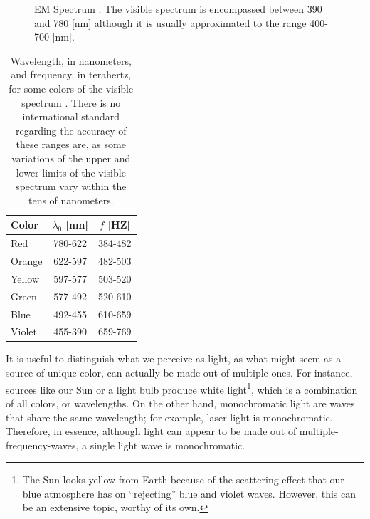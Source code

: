 \begin{figure}[htbp]
    \centering
    \caption{EM Spectrum \cite{EM_Spectrum-Figure}. The visible spectrum is encompassed between 390 and 780 [nm] although it is usually approximated to the range 400-700 [nm].}
    \label{fig:EM_Spectrum}
\end{figure}

\begin{table}[htbp]
    \centering
    \begin{tabular}{|l|c|c|}
    \hline
    \textbf{Color} & \textbf{$\lambda_0$ [nm]} & \textbf{$f$ [HZ]} \\ \hline
    Red           & 780-622                       & 384-482                  \\ \hline
    Orange        & 622-597                       & 482-503                  \\ \hline
    Yellow       & 597-577                       & 503-520                  \\ \hline
    Green          & 577-492                       & 520-610                  \\ \hline
    Blue           & 492-455                       & 610-659                  \\ \hline
    Violet        & 455-390                       & 659-769                  \\ \hline
    \end{tabular}
    \caption{Wavelength, in nanometers, and frequency, in terahertz, for some colors of the visible spectrum \cite{Hecht_Optics-Visible_Light}. There is no international standard regarding the accuracy of these ranges are, as some variations of the upper and lower limits of the visible spectrum vary within the tens of nanometers.}
    \label{tab:VisibleLight}
\end{table}

\newpage
It is useful to distinguish what we perceive as light, as what might seem as a source of unique color, can actually be made out of multiple ones. For instance, sources like our Sun or a light bulb produce white light\footnote{The Sun looks yellow from Earth because of the scattering effect that our blue atmosphere has on ``rejecting'' blue and violet waves. However, this can be an extensive topic, worthy of its own.}, which is a combination of all colors, or wavelengths. On the other hand, monochromatic light are waves that share the same wavelength; for example, laser light is monochromatic. Therefore, in essence, although light can appear to be made out of multiple-frequency-waves, a single light wave is monochromatic.


